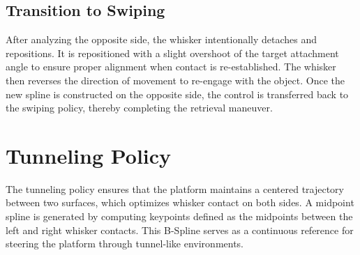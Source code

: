 \subsection{Transition to Swiping}
After analyzing the opposite side, the whisker intentionally detaches and repositions.
It is repositioned with a slight overshoot of the target attachment angle to ensure proper alignment when contact is re-established.
The whisker then reverses the direction of movement to re-engage with the object.
Once the new spline is constructed on the opposite side, the control is transferred back to the swiping policy, thereby completing the retrieval maneuver.


\section{Tunneling Policy}

The tunneling policy ensures that the platform maintains a centered trajectory between two surfaces, which optimizes whisker contact on both sides.
A midpoint spline is generated by computing keypoints defined as the midpoints between the left and right whisker contacts.
This B-Spline serves as a continuous reference for steering the platform through tunnel-like environments.

